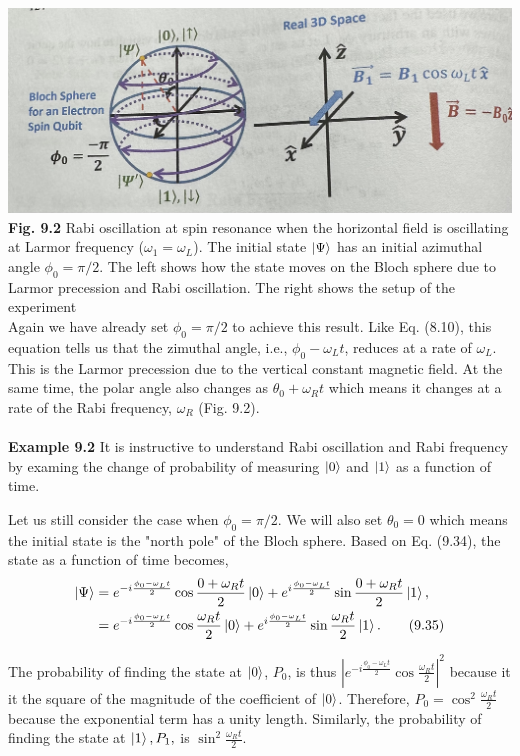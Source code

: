 \documentclass{article}
\begin{document}
\includegraphics[scale=0.5]{fig. 9.2.jpeg}\\
\textbf{Fig. 9.2} Rabi oscillation at spin resonance when the horizontal field is oscillating at Larmor frequency ($\omega_1=\omega_L$).
The initial state $\ket{\Psi}$ has an initial azimuthal angle $\phi_0=\pi/2$. The left shows how the state moves on the Bloch sphere due to 
Larmor precession and Rabi oscillation. The right shows the setup of the experiment\\

Again we have already set $\phi_0=\pi/2$ to achieve this result. Like Eq. (8.10), this equation tells us that the zimuthal angle,
i.e., $\phi_0-\omega_L t$, reduces at a rate of $\omega_L$. This is the Larmor precession due to the vertical constant magnetic field.
At the same time, the polar angle also changes as $\theta_0+\omega_Rt$ which means it changes at a rate of the Rabi frequency, $\omega_R$
(Fig. 9.2).\\\\
\textbf{Example 9.2} It is instructive to understand Rabi oscillation and Rabi frequency by
examing the change of probability of measuring $\ket{0}$ and $\ket{1}$ as a function of time.

Let us still consider the case when $\phi_0=\pi/2$. We will also set $\theta_0=0$ which
means the initial state is the "north pole" of the Bloch sphere. Based on Eq. (9.34), the state
as a function of time becomes,
\begin{align*}\label{eq 9.35}
    \ket{\Psi}&=e^{-i\frac{\phi_0-\omega_Lt}{2}}\cos\frac{0+\omega_Rt}{2}\ket{0}+
    e^{i\frac{\phi_0-\omega_Lt}{2}}\sin\frac{0+\omega_Rt}{2}\ket{1},\\
    &=e^{-i\frac{\phi_0-\omega_Lt}{2}}\cos\frac{\omega_Rt}{2}\ket{0}+
    e^{i\frac{\phi_0-\omega_Lt}{2}}\sin\frac{\omega_Rt}{2}\ket{1}.\tag{9.35}
\end{align*}

The probability of finding the state at $\ket{0}$, \textit{$P_0$}, is thus $|e^{-i\frac{\phi_0-\omega_Lt}{2}}\cos\frac{\omega_Rt}{2}|^2$
because it it the square of the magnitude of the coefficient of $\ket{0}$. Therefore, $P_0=\cos^2\frac{\omega_Rt}{2}$
because the exponential term has a unity length. Similarly, the probability of finding the state at $\ket{1}, P_1,$ is $\sin^2\frac{\omega_Rt}{2}$.
\end{document}
